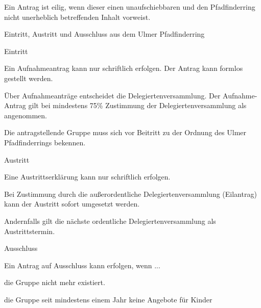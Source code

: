\begin{legal}
\begin{legal}
\begin{legal}
                      \item Ein Antrag ist eilig, wenn dieser einen unaufschiebbaren und den 
                            Pfadfinderring nicht unerheblich betreffenden Inhalt vorweist.
                  \end{legal}
        \end{legal}
    \item Eintritt, Austritt und Ausschluss aus dem Ulmer Pfadfinderring
        \begin{legal}
            \item Eintritt
                \begin{legal}
                    \item Ein Aufnahmeantrag kann nur schriftlich erfolgen.
                          Der Antrag kann formlos gestellt werden.
                    \item Über Aufnahmeanträge entscheidet die Delegiertenversammlung.
                          Der Aufnahme-Antrag gilt bei mindestens 75\% Zustimmung 
                          der Delegiertenversammlung als angenommen.
                    \item Die antragstellende Gruppe muss sich vor Beitritt zu der Ordnung des 
                          Ulmer Pfadfinderrings bekennen.
                \end{legal}
            \item Austritt
                \begin{legal}
                    \item Eine Austrittserklärung kann nur schriftlich erfolgen.
                    \item Bei Zustimmung durch die außerordentliche Delegiertenversammlung 
                          (Eilantrag) kann der Austritt sofort umgesetzt werden.
                    \item Andernfalls gilt die nächste ordentliche Delegiertenversammlung als 
                          Austrittstermin.
                \end{legal}
            \item Ausschluss
                \begin{legal}
                    \item Ein Antrag auf Ausschluss kann erfolgen, wenn ...
                        \begin{legal}
                            \item die Gruppe nicht mehr existiert.
                            \item die Gruppe seit mindestens einem Jahr keine Angebote für Kinder 

\end{legal}
\end{legal}
\end{legal}
\end{legal}
